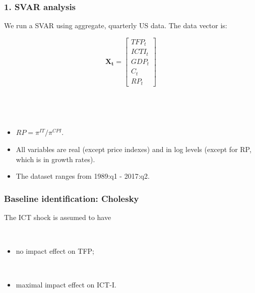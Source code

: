 \documentclass{beamer}
\begin{document}
\begin{frame}
	\frametitle{1. SVAR analysis}

	We run a SVAR using aggregate, quarterly US data. The data vector is:
	
	\begin{equation}
	\mathbf{X_t} = 
	\begin{bmatrix}
    TFP_t      \\
 
   ICTI_t   \\
      
   GDP_t \\
   
   C_t \\
   
   RP_t
\end{bmatrix}
	\end{equation}
	


\

\

\begin{itemize}
\item $RP = \pi^{IT}/\pi^{CPI}$. 
\item All variables are real (except price indexes) and in log levels (except for RP, which is in growth rates). 
\item The dataset ranges from 1989:q1 - 2017:q2.
\end{itemize}	
	
\end{frame}

\begin{frame}
	\frametitle{Baseline identification: Cholesky}
	\label{baseline_spec}
	
	The ICT shock is assumed to have
	
	\
	
	\begin{itemize}
	\item no impact effect on TFP;
	
	\
	
	\item maximal impact effect on ICT-I.
	\end{itemize}



\end{frame}
\end{document}
